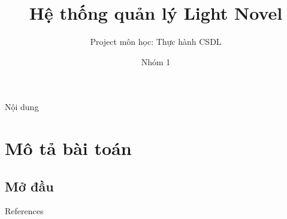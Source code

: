 \documentclass[12pt,aspectratio=169,handout]{beamer}
\title[HTQL Light Novel]{Hệ thống quản lý Light Novel}
\subtitle{Project môn học: Thực hành CSDL}
\author{Nhóm 1}
\institute{Đại học Bách Khoa Hà Nội}
\begin{document}
\titlepage

\begin{frame}{Nội dung}
    \tableofcontents[pausesections]
\end{frame}


\section{Mô tả bài toán}

\subsection{Mở đầu}
\begin{frame}{References}


\end{frame}





\end{document}
